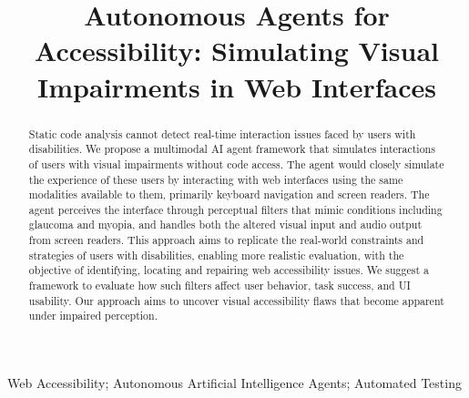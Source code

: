 \documentclass[10pt, conference]{IEEEtran}
\begin{document}
\title{Autonomous Agents for Accessibility: Simulating Visual Impairments in Web Interfaces}

\author{
}

\maketitle

\begin{abstract}
Static code analysis cannot detect real-time interaction issues faced by users with disabilities. We propose a multimodal \ac{AI} agent framework that simulates interactions of users with visual impairments without code access. 
The agent would closely simulate the experience of these users by interacting with web interfaces using the same modalities available to them, primarily keyboard navigation and screen readers. The agent perceives the interface through perceptual filters that mimic conditions including glaucoma and myopia, and handles both the altered visual input and audio output from screen readers. 
This approach aims to replicate the real-world constraints and strategies of users with disabilities, enabling more realistic evaluation, with the objective of identifying, locating and repairing web accessibility issues. 
We suggest a framework to evaluate how such filters affect user behavior, task success, and \ac{UI} usability. Our approach aims to uncover visual accessibility flaws that become apparent under impaired perception. 
\end{abstract}

\begin{IEEEkeywords}
Web Accessibility; Autonomous Artificial Intelligence Agents; Automated Testing
\end{IEEEkeywords}









\balance


\end{document}
